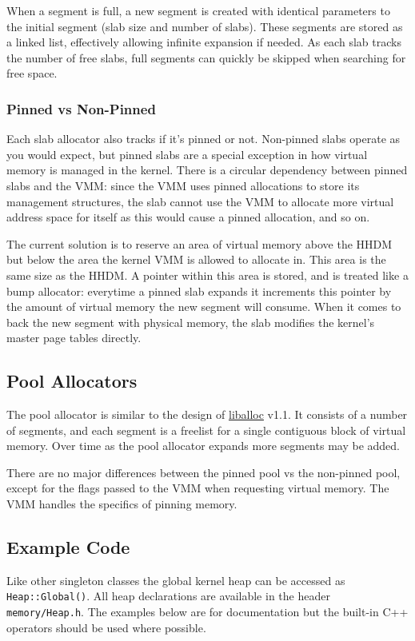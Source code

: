 When a segment is full, a new segment is created with identical parameters to the initial segment (slab size and number of slabs). These segments are stored as a linked list, effectively allowing infinite expansion if needed. As each slab tracks the number of free slabs, full segments can quickly be skipped when searching for free space.

\subsubsection{Pinned vs Non-Pinned}
Each slab allocator also tracks if it's pinned or not. Non-pinned slabs operate as you would expect, but pinned slabs are a special exception in how virtual memory is managed in the kernel. There is a circular dependency between pinned slabs and the VMM: since the VMM uses pinned allocations to store its management structures, the slab cannot use the VMM to allocate more virtual address space for itself as this would cause a pinned allocation, and so on. 

The current solution is to reserve an area of virtual memory above the HHDM but below the area the kernel VMM is allowed to allocate in. This area is the same size as the HHDM. A pointer within this area is stored, and is treated like a bump allocator: everytime a pinned slab expands it increments this pointer by the amount of virtual memory the new segment will consume. When it comes to back the new segment with physical memory, the slab modifies the kernel's master page tables directly.

\subsection{Pool Allocators}
The pool allocator is similar to the design of \hyperlink{https://github.com/blanham/liballoc}{liballoc} v1.1. It consists of a number of segments, and each segment is a freelist for a single contiguous block of virtual memory. Over time as the pool allocator expands more segments may be added. 

There are no major differences between the pinned pool vs the non-pinned pool, except for the flags passed to the VMM when requesting virtual memory. The VMM handles the specifics of pinning memory.

\subsection{Example Code}
Like other singleton classes the global kernel heap can be accessed as \verb|Heap::Global()|. All heap declarations are available in the header \verb|memory/Heap.h|. The examples below are for documentation but the built-in C++ operators should be used where possible.

